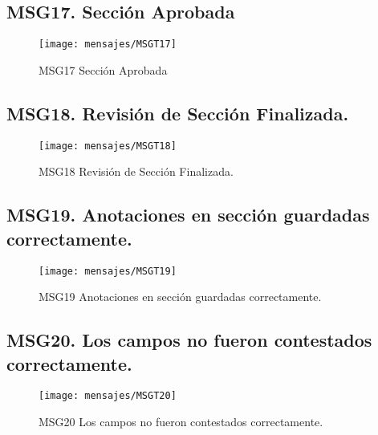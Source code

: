 \subsection{MSG17. Sección Aprobada}
    \begin{figure}[htbp]
        \begin{center}
            \texttt{[image: mensajes/MSGT17]}
            \caption{MSG17 Sección Aprobada}
            \label{fig:MSG17}
        \end{center}
    \end{figure}
    

\subsection{MSG18. Revisión de Sección Finalizada.}
    \begin{figure}[htbp]
        \begin{center}
            \texttt{[image: mensajes/MSGT18]}
            \caption{MSG18 Revisión de Sección Finalizada.}
            \label{fig:MSG18}
        \end{center}
    \end{figure}
    
\subsection{MSG19. Anotaciones en sección guardadas correctamente.}
    \begin{figure}[htbp]
        \begin{center}
            \texttt{[image: mensajes/MSGT19]}
            \caption{MSG19 Anotaciones en sección guardadas correctamente.}
            \label{fig:MSG19}
        \end{center}
    \end{figure}

\subsection{MSG20. Los campos no fueron contestados correctamente.}
    \begin{figure}[htbp]
        \begin{center}
            \texttt{[image: mensajes/MSGT20]}
            \caption{MSG20 Los campos no fueron contestados correctamente.}
            \label{fig:MSG20}
        \end{center}
    \end{figure}

